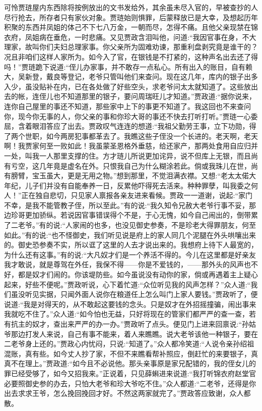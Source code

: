 \begin{parag}
    可怜贾琏屋内东西除将按例放出的文书发给外，其余虽未尽入官的，早被查抄的人尽行抢去，所存者只有家伙对象。贾琏始则惧罪，后蒙释放已是大幸，及想起历年积聚的东西并凤姐的体己不下七八万金，一朝而尽，怎得不痛。且他父亲现禁在锦衣府，凤姐病在垂危，一时悲痛。又见贾政含泪叫他，问道:“我因官事在身，不大理家，故叫你们夫妇总理家事。你父亲所为固难劝谏，那重利盘剥究竟是谁干的？况且非咱们这样人家所为。如今入了官，在银钱是不打紧的，这种声名出去还了得吗！”贾琏跪下说道:“侄儿办家事，并不敢存一点私心。所有出入的账目，自有赖大，吴新登，戴良等登记，老爷只管叫他们来查问。现在这几年，库内的银子出多入少，虽没贴补在内，已在各处做了好些空头，求老爷问太太就知道了。这些放出去的帐，连侄儿也不知道那里的银子，要问周瑞旺儿才知道。”贾政道:“据你说来，连你自己屋里的事还不知道，那些家中上下的事更不知道了。我这回也不来查问你，现今你无事的人，你父亲的事和你珍大哥的事还不快去打听打听。”贾琏一心委屈，含着眼泪答应了出去。贾政叹气连连的想道:“我祖父勤劳王事，立下功勋，得了两个世职，如今两房犯事都革去了。我瞧这些子侄没一个长进的。老天啊，老天啊！我贾家何至一败如此！我虽蒙圣恩格外垂慈，给还家产，那两处食用自应归并一处，叫我一人那里支撑的住。方才琏儿所说更加诧异，说不但库上无银，而且尚有亏空，这几年竟是虚名在外。只恨我自己为什么糊涂若此。倘或我珠儿在世，尚有膀臂，宝玉虽大，更是无用之物。”想到那里，不觉泪满衣襟。又想:“老太太偌大年纪，儿子们并没有自能奉养一日，反累他吓得死去活来。种种罪孽，叫我委之何人！”正在独自悲切，只见家人禀报各亲友进来看候。贾政一一道谢，说起:“家门不幸，是我不能管教子侄，所以至此。”有的说:“我久知令兄赦大老爷行事不妥，那边珍哥更加骄纵。若说因官事错误得个不是，于心无愧，如今自己闹出的，倒带累了二老爷。”有的说:“人家闹的也多，也没见御史参奏，不是珍老大得罪朋友，何至如此。”有的说:“也不怪御史，我们听见说是府上的家人同几个泥腿在外头哄嚷出来的。御史恐参奏不实，所以诓了这里的人去才说出来的。我想府上待下人最宽的，为什么还有这事。”有的说:“大凡奴才们是一个养活不得的。今儿在这里都是好亲友我才敢说，就是尊驾在外任，我保不得——你是不爱钱的，——那外头的风声也不好，都是奴才们闹的。你该堤防些。如今虽说没有动你的家，倘或再遇着主上疑心起来，好些不便呢。”贾政听说，心下着忙道:“众位听见我的风声怎样？”众人道:“我们虽没听见实据，只闻外面人说你在粮道任上怎么叫门上家人要钱。”贾政听了，便说道:“我是对得天的，从不敢起这要钱的念头。只是奴才在外招摇撞骗，闹出事来我就吃不住了。”众人道:“如今怕也无益，只好将现在的管家们都严严的查一查，若有抗主的奴才，查出来严严的办一办。”贾政听了点头。便见门上进来回禀说:“孙姑爷那边打发人来说，自己有事不能来，着人来瞧瞧。说大老爷该他一种银子，要在二老爷身上还的。”贾政心内忧闷，只说:“知道了。”众人都冷笑道:“人说令亲孙绍祖混账，真有些。如今丈人抄了家，不但不来瞧看帮补照应，倒赶忙的来要银子，真真不在理上。”贾政道:“如今且不必说他。那头亲事原是家兄配错的，我的侄女儿的罪已经受够了，如今又招我来。”正说着，只见薛蝌进来说道:“我打听锦衣府赵堂官必要照御史参的办去，只怕大老爷和珍大爷吃不住。”众人都道:“二老爷，还得是你出去求求王爷，怎么挽回挽回才好。不然这两家就完了。”贾政答应致谢，众人都散。
\end{parag}


